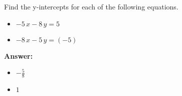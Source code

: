  Find the y-intercepts for each of the following equations. \begin{itemize}\item \( -5 \, x - 8 \, y = 5 \)\item \( -8 \, x - 5 \, y = \left(-5\right) \)\end{itemize}

        \textbf{Answer:} \begin{itemize}\item \( -\frac{5}{8} \)\item \( 1 \)\end{itemize}
